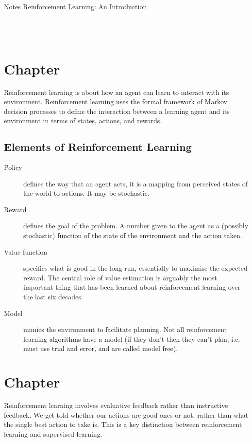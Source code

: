 \documentclass[a4paper, oneside, 11pt]{article}
\newcommand\Rule{\noindent\makebox[\textwidth]{\rule{\textwidth}{0.5pt}}}
\begin{document}
{\huge Notes} \hfill {\huge Reinforcement Learning: An Introduction}\\
\Rule\\
\tableofcontents
\mbox{}\\
\Rule
\mbox{}\\


\clearpage
\section{Chapter}
Reinforcement learning is about how an agent can learn to interact with its environment. Reinforcement learning uses the formal framework of Markov decision processes to define the interaction between a learning agent and its environment in terms of states, actions, and rewards.

\setcounter{subsection}{2}
\subsection{Elements of Reinforcement Learning}
\begin{description}
     \item[Policy] defines the way that an agent acts, it is a mapping from perceived states of the world to actions. It may be stochastic.
     \item[Reward] defines the goal of the problem. A number given to the agent as a (possibly stochastic) function of the state of the environment and the action taken.
     \item[Value function] specifies what is good in the long run, essentially to maximise the expected reward. The central role of value estimation is arguably the most important thing that has been learned about reinforcement learning over the last six decades.
     \item[Model] mimics the environment to facilitate planning. Not all reinforcement learning algorithms have a model (if they don't then they can't plan, i.e. must use trial and error, and are called model free).
\end{description}


\section{Chapter}
Reinforcement learning involves evaluative feedback rather than instructive feedback. We get told whether our actions are good ones or not, rather than what the single best action to take is. This is a key distinction between reinforcement learning and supervised learning.
\end{document}
